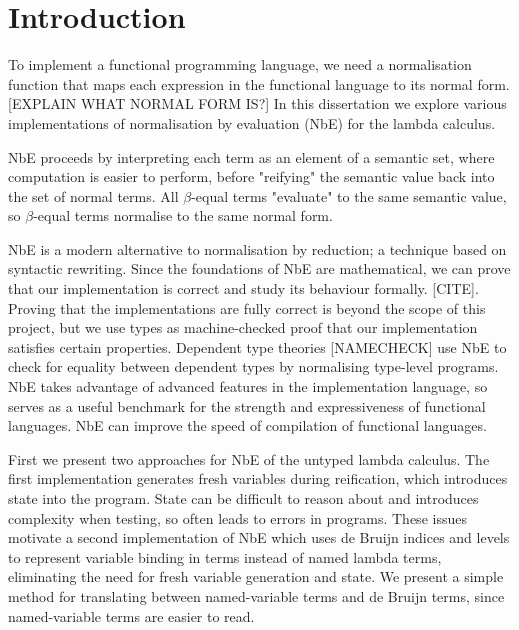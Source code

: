 \chapter{Introduction}
\label{chap:introduction}

To implement a functional programming language, we need a normalisation function that maps each expression in the functional language to its normal form. [EXPLAIN WHAT NORMAL FORM IS?]
In this dissertation we explore various implementations of normalisation by evaluation (NbE) for the lambda calculus.

NbE proceeds by interpreting each term as an element of a semantic set, where computation is easier to perform, before "reifying" the semantic value back into the set of normal terms. All $\beta$-equal terms "evaluate" to the same semantic value, so $\beta$-equal terms normalise to the same normal form.

NbE is a modern alternative to normalisation by reduction; a technique based on syntactic rewriting. Since the foundations of NbE are mathematical, we can prove that our implementation is correct and study its behaviour formally. [CITE]. Proving that the implementations are fully correct is beyond the scope of this project, but we use types as machine-checked proof that our implementation satisfies certain properties.
Dependent type theories [NAMECHECK] use NbE to check for equality between dependent types by normalising type-level programs.
NbE takes advantage of advanced features in the implementation language, so serves as a useful benchmark for the strength and expressiveness of functional languages.
NbE can improve the speed of compilation of functional languages. \cite{efficientNbE}

First we present two approaches for NbE of the untyped lambda calculus. The first implementation generates fresh variables during reification, which introduces state into the program. State can be difficult to reason about and introduces complexity when testing, so often leads to errors in programs. These issues motivate a second implementation of NbE which uses de Bruijn indices and levels to represent variable binding in terms instead of named lambda terms, eliminating the need for fresh variable generation and state. We present a simple method for translating between named-variable terms and de Bruijn terms, since named-variable terms are easier to read. 

